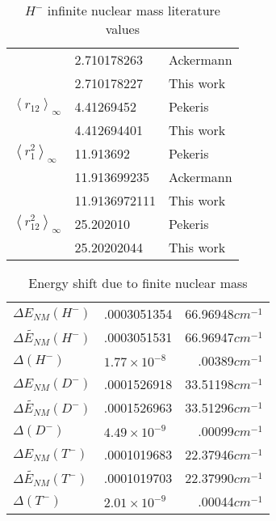 \documentclass[12pt,thmsa]{article}
\begin{document}
\begin{table}[t]
\begin{tabular}{lll}
& 2.710178263 & {\footnotesize Ackermann}\cite{Ackermann95} \\ 
& 2.710178227 & {\footnotesize This work} \\ \hline
$\left\langle r_{12}\right\rangle _\infty $ & 4.41269452 & {\footnotesize %
Pekeris}\cite{Pekeris62} \\ 
& 4.412694401 & {\footnotesize This work} \\ \hline
$\left\langle r_1^2\right\rangle _\infty $ & 11.913692 & {\footnotesize %
Pekeris}\cite{Pekeris62} \\ 
& 11.913699235 & {\footnotesize Ackermann}\cite{Ackermann95} \\ 
& 11.9136972111 & {\footnotesize This work} \\ \hline
$\left\langle r_{12}^2\right\rangle _\infty $ & 25.202010 & {\footnotesize %
Pekeris}\cite{Pekeris62} \\ 
& 25.20202044 & {\footnotesize This work} \\ \hline\hline
\end{tabular}
\caption{$H^{-}$  infinite nuclear mass literature values \label{Litdata}}%
\end{table}%

\begin{table}[t] \centering%
\begin{tabular}{lll}
\hline\hline
$\Delta E_{NM}\left( H^{-}\right) $ & .0003051354 & 66.96948$cm^{-1}$ \\ 
$\widetilde{\Delta E_{NM}}\left( H^{-}\right) $ & .0003051531 & 
\multicolumn{1}{r}{66.96947$cm^{-1}$} \\ 
$\Delta \left( H^{-}\right) $ & $1.77\times 10^{-8}$ & \multicolumn{1}{r}{
.00389$cm^{-1}$} \\ \hline
$\Delta E_{NM}\left( D^{-}\right) $ & .0001526918 & \multicolumn{1}{r}{
33.51198$cm^{-1}$} \\ 
$\widetilde{\Delta E_{NM}}\left( D^{-}\right) $ & .0001526963 & 
\multicolumn{1}{r}{33.51296$cm^{-1}$} \\ 
$\Delta \left( D^{-}\right) $ & $4.49\times 10^{-9}$ & \multicolumn{1}{r}{
.00099$cm^{-1}$} \\ \hline
$\Delta E_{NM}\left( T^{-}\right) $ & .0001019683 & \multicolumn{1}{r}{
22.37946$cm^{-1}$} \\ 
$\widetilde{\Delta E_{NM}}\left( T^{-}\right) $ & .0001019703 & 
\multicolumn{1}{r}{22.37990$cm^{-1}$} \\ 
$\Delta \left( T^{-}\right) $ & $2.01\times 10^{-9}$ & \multicolumn{1}{r}{
.00044$cm^{-1}$} \\ \hline\hline
\end{tabular}
\caption{Energy shift due to finite nuclear mass\label{NMtab}}%
\end{table}%
\end{document}
